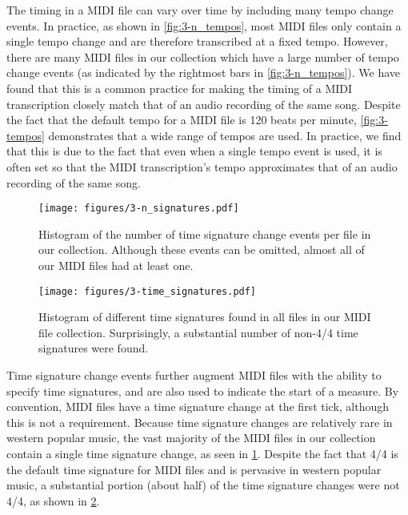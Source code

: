 The timing in a MIDI file can vary over time by including many tempo change events.
In practice, as shown in \cref{fig:3-n_tempos}, most MIDI files only contain a single tempo change and are therefore transcribed at a fixed tempo.
However, there are many MIDI files in our collection which have a large number of tempo change events (as indicated by the rightmost bars in \cref{fig:3-n_tempos}).
We have found that this is a common practice for making the timing of a MIDI transcription closely match that of an audio recording of the same song.
Despite the fact that the default tempo for a MIDI file is 120 beats per minute, \cref{fig:3-tempos} demonstrates that a wide range of tempos are used.
In practice, we find that this is due to the fact that even when a single tempo event is used, it is often set so that the MIDI transcription's tempo approximates that of an audio recording of the same song.

\begin{figure}
  \centering
  \texttt{[image: figures/3-n\_signatures.pdf]}
  \caption[Histogram of the number of time signature changes in MIDI files]{Histogram of the number of time signature change events per file in our collection.
Although these events can be omitted, almost all of our MIDI files had at least one.}
    \label{fig:3-n_signatures}
\end{figure}

\begin{figure}
  \centering
  \texttt{[image: figures/3-time\_signatures.pdf]}
  \caption[Histogram of time signatures]{Histogram of different time signatures found in all files in our MIDI file collection.
Surprisingly, a substantial number of non-4/4 time signatures were found.}
    \label{fig:3-time_signatures}
\end{figure}

Time signature change events further augment MIDI files with the ability to specify time signatures, and are also used to indicate the start of a measure.
By convention, MIDI files have a time signature change at the first tick, although this is not a requirement.
Because time signature changes are relatively rare in western popular music, the vast majority of the MIDI files in our collection contain a single time signature change, as seen in \cref{fig:3-n_signatures}.
Despite the fact that 4/4 is the default time signature for MIDI files and is pervasive in western popular music, a substantial portion (about half) of the time signature changes were not 4/4, as shown in \cref{fig:3-time_signatures}.

